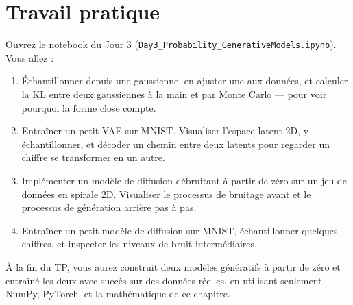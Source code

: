 \section*{Travail pratique}

Ouvrez le notebook du Jour 3 (\texttt{Day3\_Probability\_GenerativeModels.ipynb}). Vous allez :

\begin{enumerate}
  \item Échantillonner depuis une gaussienne, en ajuster une aux données, et calculer la KL entre deux gaussiennes à la main et par Monte Carlo --- pour voir pourquoi la forme close compte.
  \item Entraîner un petit VAE sur MNIST. Visualiser l'espace latent 2D, y échantillonner, et décoder un chemin entre deux latents pour regarder un chiffre se transformer en un autre.
  \item Implémenter un modèle de diffusion débruitant à partir de zéro sur un jeu de données en spirale 2D. Visualiser le processus de bruitage avant et le processus de génération arrière pas à pas.
  \item Entraîner un petit modèle de diffusion sur MNIST, échantillonner quelques chiffres, et inspecter les niveaux de bruit intermédiaires.
\end{enumerate}

À la fin du TP, vous aurez construit deux modèles génératifs à partir de zéro et entraîné les deux avec succès sur des données réelles, en utilisant seulement NumPy, PyTorch, et la mathématique de ce chapitre.
